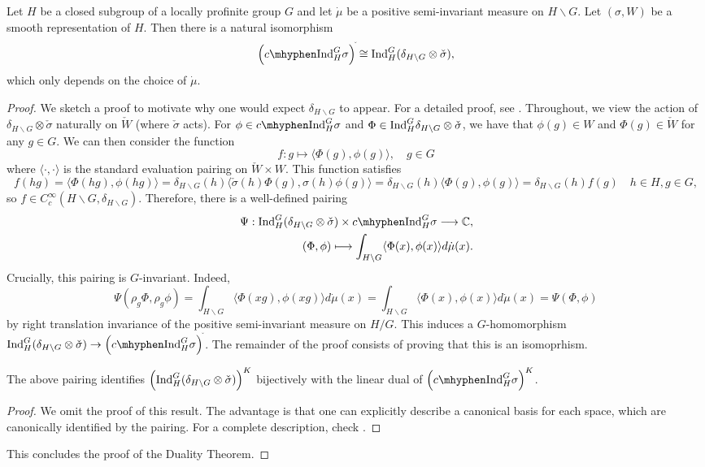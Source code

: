 \begin{thm}\label{thm:duality}
    Let $H$ be a closed subgroup of a locally profinite group $G$ and let $\dot{\mu}$ be a positive semi-invariant measure on $H\backslash G$. Let $(\sigma,W)$ be a smooth representation of $H$. Then there is a natural isomorphism
    $$\left(\cInd_H^G\sigma \right)^{\check{}}\cong \Ind_H^G(\delta_{H\backslash G}\otimes \check{\sigma}),$$
    which only depends on the choice of $\dot{\mu}$.
\end{thm}

\begin{proof}
    We sketch a proof to motivate why one would expect $\delta_{H\backslash G}$ to appear. For a detailed proof, see \cite[Theorem 3.5]{BH1}.
    Throughout, we view the action of $\delta_{H\backslash G}\otimes\check{\sigma}$ naturally on $\check{W}$ (where $\check{\sigma}$ acts). For $\phi\in \cInd_H^G\sigma$ and $\Phi\in\mathrm{Ind}_H^G\delta_{H\backslash G}\otimes\check{\sigma}$, 
    we have that $\phi(g)\in W$ and $\Phi(g)\in\check{W}$ for any $g\in G$. We can then consider the function $$f:g\longmapsto\langle\Phi(g),\phi(g)\rangle,\quad g\in G $$ 
    where $\langle\cdot,\cdot\rangle$ is the standard evaluation pairing on $\check{W}\times W$. This function satisfies 
    $$f(hg)=\langle\Phi(hg),\phi(hg)\rangle=\delta_{H\backslash G}(h)\langle\check{\sigma}(h)\Phi(g),\sigma(h)\phi(g)\rangle=\delta_{H\backslash G}(h)\langle\Phi(g),\phi(g)\rangle=\delta_{H\backslash G}(h)f(g)\quad h\in H, g\in G,$$
    so $f\in C_c^\infty(H\backslash G,\delta_{H\backslash G})$.
    Therefore, there is a well-defined pairing 
    \begin{align*}
        \Psi:\Ind_H^G(\delta_{H\backslash G}\otimes\check{\sigma})\times \cInd_H^G\sigma\longrightarrow\CC&,\\
        (\Phi,\phi)\longmapsto\int_{H\backslash G}\langle\Phi(x),\phi(x)\rangle d\dot{\mu}(x)&.
    \end{align*}
    Crucially, this pairing is $G$-invariant. Indeed, 
    $$\Psi(\rho_g\Phi,\rho_g\phi)=\int_{H\backslash G}\langle\Phi(xg),\phi(xg)\rangle d\dot{\mu}(x)=\int_{H\backslash G}\langle\Phi(x),\phi(x)\rangle d\dot{\mu}(x)=\Psi(\Phi,\phi)$$
    by right translation invariance of the positive semi-invariant measure on $H/G$. 
    This induces a $G$-homomorphism $\Ind_H^G(\delta_{H\backslash G}\otimes \check{\sigma})\to \left(\cInd_H^G\sigma \right)^{\check{}}$. The remainder of the proof consists of proving that this is an isomoprhism.

    \begin{lemma}
        The above pairing identifies $\left(\mathrm{Ind}_H^G(\delta_{H\backslash G}\otimes \check{\sigma})\right)^K$ bijectively with the linear dual of $\left(\cInd_H^G\sigma \right)^K$.
    \end{lemma}
    \begin{proof}
        We omit the proof of this result. The advantage is that one can explicitly describe a canonical basis for each space, which are canonically identified by the pairing. For a complete description, check \cite[Lemma 3.5.2]{BH1}.
    \end{proof}
    This concludes the proof of the Duality Theorem.
\end{proof}

